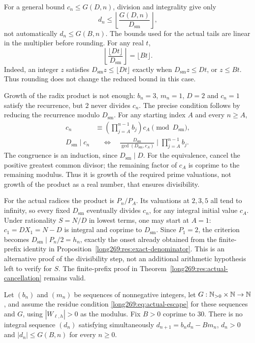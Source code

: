 \documentclass[11pt]{article}
\theoremstyle{remark}
\theoremstyle{plain}
\begin{document}
For a general bound $c_n\le G(D,n)$, division and integrality give only
\[
 d_n\le\left\lfloor\frac{G(D,n)}{D_{\mathrm{sm}}}\right\rfloor,
\]
not automatically $d_n\le G(B,n)$.  The bounds used for the actual tails
are linear in the multiplier before rounding.  For any real $t$,
\[
 \left\lfloor\frac{\lfloor Dt\rfloor}{D_{\mathrm{sm}}}\right\rfloor
 =\lfloor Bt\rfloor.
\]
Indeed, an integer $z$ satisfies $D_{\mathrm{sm}}z\le\lfloor Dt\rfloor$
exactly when $D_{\mathrm{sm}}z\le Dt$, or $z\le Bt$.
Thus rounding does not change the reduced bound in this case.

Growth of the radix product is not enough: $b_n=3$, $m_n=1$, $D=2$
and $c_n=1$ satisfy the recurrence, but $2$ never divides $c_n$.
The precise condition follows by reducing the recurrence modulo
$D_{\mathrm{sm}}$.  For any starting index $A$ and every $n\ge A$,
\[
 \begin{aligned}
 c_n&\equiv\left(\prod_{j=A}^{n-1}b_j\right)c_A
       \pmod{D_{\mathrm{sm}}},\\
 D_{\mathrm{sm}}\mid c_n
 &\quad\Longleftrightarrow\quad
 \frac{D_{\mathrm{sm}}}{\gcd(D_{\mathrm{sm}},c_A)}
       \mid\prod_{j=A}^{n-1}b_j.
 \end{aligned}
\]
The congruence is an induction, since $D_{\mathrm{sm}}\mid D$.
For the equivalence, cancel the positive greatest common divisor;
the remaining factor of $c_A$ is coprime to the remaining modulus.
Thus it is growth of the required prime valuations, not growth of the
product as a real number, that ensures divisibility.

For the actual radices the product is $P_n/P_A$.  Its valuations at
$2,3,5$ all tend to infinity, so every fixed $D_{\mathrm{sm}}$ eventually
divides $c_n$, for any integral initial value $c_A$.  Under rationality
$S=N/D$ in lowest terms, one may start at $A=1$:
$c_1=DX_1=N-D$ is integral and coprime to $D_{\mathrm{sm}}$.
Since $P_1=2$, the criterion becomes
$D_{\mathrm{sm}}\mid P_n/2=h_n$, exactly the onset already obtained
from the finite-prefix identity in Proposition~\ref{long269:res:exact-denominator}.
This is an alternative proof of the divisibility step, not an additional
arithmetic hypothesis left to verify for $S$.  The finite-prefix proof
in Theorem~\ref{long269:res:actual-cancellation} remains valid.

\begin{proposition}
\label{long269:long:windowconsumer}
Let $(b_n)$ and $(m_n)$ be sequences of nonnegative integers, let
$G:\mathbb{N}_{>0}\times\mathbb{N}\to\mathbb{N}$, and assume the residue condition
\eqref{long269:eq:actual-escape} for these sequences and $G$, using
$|W_{\ell,h}|>0$ as the modulus.
Fix $B>0$ coprime to $30$.  There is no integral sequence $(d_n)$ satisfying
simultaneously $d_{n+1}=b_nd_n-Bm_n$, $d_n>0$ and $|d_n|\le G(B,n)$ for every
$n\ge0$.
\end{proposition}
\end{document}
